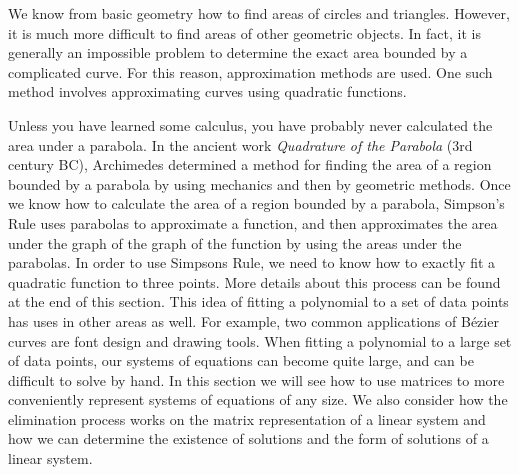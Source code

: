  \label{sec:matrix_representation}


\vspace*{-17 pt}

\vspace*{13 pt}


We know from basic geometry how to find areas of circles and triangles. However, it is much more difficult to find areas of other geometric objects. In fact, it is generally an impossible problem to determine the exact area bounded by a complicated curve. For this reason, approximation methods are used. One such method involves approximating curves using quadratic functions.

Unless you have learned some calculus, you have probably never calculated the area under a parabola. In the ancient work \emph{Quadrature of the Parabola} (3rd century BC), Archimedes determined a method for finding the area of a region bounded by a parabola by using mechanics and then by geometric methods. Once we know how to calculate the area of a region bounded by a parabola, Simpson's Rule uses parabolas to approximate a function, and then approximates the area under the graph of the graph of the function by using the areas under the parabolas. In order to use Simpsons Rule, we need to know how to exactly fit a quadratic function to three points. More details about this process can be found at the end of this section. This idea of fitting a polynomial to a set of data points has uses in other areas as well. For example, two common applications of B\'{e}zier curves are font design and drawing tools. When fitting a polynomial to a large set of data points, our systems of equations can become quite large, and can be difficult to solve by hand.  In this section we will see how to use matrices to more conveniently represent systems of equations of any size. We also consider how the elimination process works on the matrix representation of a linear system and how we can determine the existence of solutions and the form of solutions of a linear system.

